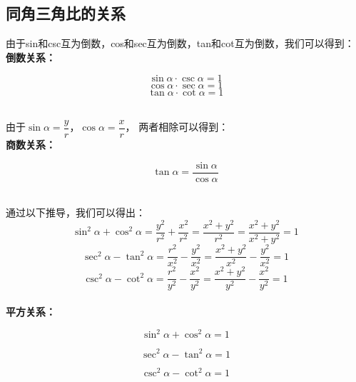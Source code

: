 \documentclass[UTF8]{ctexart}
\begin{document}
\subsection{同角三角比的关系}
    由于sin和csc互为倒数，cos和sec互为倒数，tan和cot互为倒数，我们可以得到：\\
    \newline
    \textbf{倒数关系：}
    \begin{large}
    \begin{equation*}
        \sin{\alpha} \cdot \csc{\alpha}=1
    \end{equation*}
    \begin{equation*}
        \cos{\alpha} \cdot \sec{\alpha}=1
    \end{equation*}   
    \begin{equation*}
        \tan{\alpha} \cdot \cot{\alpha}=1
    \end{equation*}
    \end{large}\\
    由于$\sin \alpha=\dfrac{y}{r}$，$\cos \alpha=\dfrac{x}{r}$，
    两者相除可以得到：\\
    \newline
    \textbf{商数关系：}
    \begin{large}
    \begin{equation*}
        \tan \alpha=\frac{\sin \alpha}{\cos \alpha}
    \end{equation*}
    \end{large}\\
    \newline
    通过以下推导，我们可以得出：
    \begin{equation*}
        \sin^2{\alpha}+\cos^2{\alpha}
        =\frac{y^2}{r^2}+\frac{x^2}{r^2}
        =\frac{x^2+y^2}{r^2}
        =\frac{x^2+y^2}{x^2+y^2}
        =1
    \end{equation*}
    \begin{equation*}
        \sec^2 \alpha-\tan^2 \alpha
        =\frac{r^2}{x^2}-\frac{y^2}{x^2}
        =\frac{x^2+y^2}{x^2}-\frac{y^2}{x^2}
        =1
    \end{equation*}
    \begin{equation*}
        \csc^2 \alpha-\cot^2 \alpha
        =\frac{r^2}{y^2}-\frac{x^2}{y^2}
        =\frac{x^2+y^2}{y^2}-\frac{x^2}{y^2}
        =1
    \end{equation*}\\
    \textbf{平方关系：}
    \begin{large}
    \begin{equation*}
        \sin^2 \alpha +\cos^2 \alpha=1
    \end{equation*}
    \end{large}
    \begin{large}
    \begin{equation*}
        \sec^2 \alpha -\tan^2 \alpha=1
    \end{equation*}
    \end{large}
    \begin{large}
    \begin{equation*}
        \csc^2 \alpha -\cot^2 \alpha=1
    \end{equation*}
    \end{large}
\end{document}
